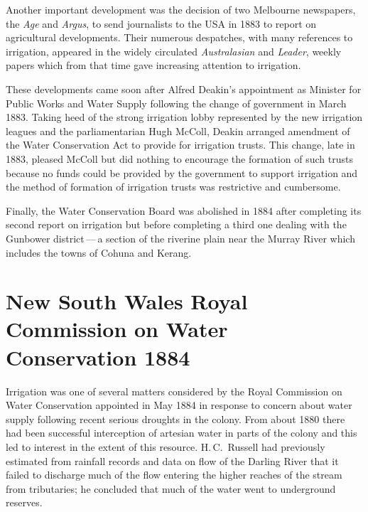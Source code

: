 Another important development was the decision of two Melbourne
newspapers, the \textit{Age} and \textit{Argus}, to send journalists
to the USA  in 1883 to report on agricultural developments.
Their numerous despatches, with many references to irrigation,
appeared in the widely circulated \textit{Australasian} and
\textit{Leader}, weekly papers which from that time gave increasing
attention to irrigation.

These developments came soon after Alfred Deakin's 
appointment as Minister for Public Works and Water Supply following
the change of government in March 1883.  Taking heed of the strong
irrigation lobby represented by the new irrigation leagues and the
parliamentarian Hugh McColl,  Deakin arranged
amendment of the Water Conservation Act to provide for irrigation
trusts.  This change, late in 1883, pleased McColl but did nothing to
encourage the formation of such trusts because no funds could be
provided by the government to support irrigation and the method of
formation of irrigation trusts was restrictive and
cumbersome.

Finally, the Water Conservation Board was abolished in 1884 after
completing its second report on irrigation but before completing a
third one dealing with the Gunbower district\,---\,a section of the
riverine plain near the Murray River  which
includes the towns of Cohuna  and   Ke\-rang.

\section*{New South Wales Royal Commission on Water Conservation 1884}
\index{NSW RC Water Conserv.}

Irrigation was one of several matters considered by the Royal
Commission on Water Conservation appointed in May 1884 in response to
concern about water supply following recent serious droughts in the
colony.  From about 1880 there had been successful interception of
artesian water in parts of the colony and this led to interest in the
extent of this resource.  H.\,C.~Russell \index{Russell, H.\,C.} had
previously estimated from rainfall records and data on flow of the
Darling River \index{river!Darling} that it failed to discharge much
of the flow entering the higher reaches of the stream from
tributaries; he concluded that much of the water went to underground
reserves.

